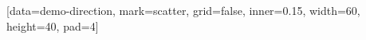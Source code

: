 \documentclass{article}
\begin{document}
\ExplSyntaxOn
\SemioVizProbeOn
\SemioVizChartsDryRun
{}
[data=demo-direction, mark=scatter, grid=false, inner=0.15, width=60, height=40, pad=4]
\ExplSyntaxOff
\end{document}

